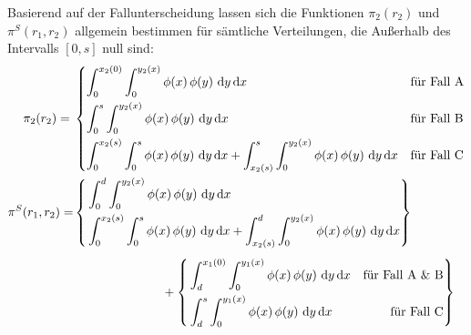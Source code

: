 Basierend auf der Fallunterscheidung lassen sich die Funktionen $\pi_2(r_2)$ und $\pi^S(r_1,r_2)$ allgemein bestimmen für sämtliche Verteilungen, die Außerhalb des Intervalls $[0,s]$ null sind:
%
{\small
\begin{align}
	\pi_2(r_2)     ={}& \begin{dcases}
	                        \int_0^{x_2(0)} \int_0^{y_2(x)} \phi(x)\,\phi(y)\ \dd y\, \dd x                                                                  & \text{für Fall~A} \\
	                        \int_0^{s} \int_0^{y_2(x)} \phi(x)\,\phi(y)\ \dd y\, \dd x                                                                       & \text{für Fall~B} \\
	                        \int_{0}^{x_2(s)} \int_0^{s} \phi(x)\,\phi(y)\ \dd y\, \dd x + \int_{x_2(s)}^{s} \int_0^{y_2(x)} \phi(x)\,\phi(y)\ \dd y\, \dd x & \text{für Fall~C}
	                    \end{dcases} \label{eqn:pi2-exact} \\
	\pi^S(r_1,r_2) =  & \left\{\!\begin{aligned}
	                                 & \displaystyle \int_0^{d} \int_0^{y_2(x)} \phi(x)\,\phi(y)\ \dd y\, \dd x \\
	                                 & \displaystyle \int_{0}^{x_2(s)} \int_0^{s} \phi(x)\,\phi(y)\ \dd y\, \dd x + \int_{x_2(s)}^{d} \int_0^{y_2(x)} \phi(x)\,\phi(y)\ \dd y\, \dd x 
	                             \end{aligned}\right\} \notag \\[1ex]
	                  & \hspace{2.5cm} + \left\{\!\begin{aligned}
	                                                  & \displaystyle \int_d^{x_1(0)} \int_0^{y_1(x)} \phi(x)\,\phi(y)\ \dd y\, \dd x & \text{für Fall~A\ \&\ B} \\
	                                                  & \displaystyle \int_d^{s} \int_0^{y_1(x)} \phi(x)\,\phi(y)\ \dd y\, \dd x      & \text{für Fall~C}
	                                              \end{aligned}\right\} \label{eqn:piS-exact}
\end{align}}

